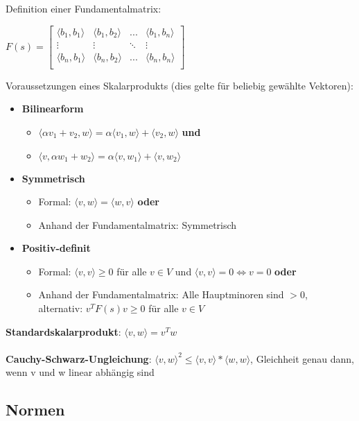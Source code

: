 Definition einer Fundamentalmatrix:
\begin{center}
	$F(s) = \begin{bmatrix}
	\langle b_1, b_1\rangle & \langle b_1, b_2\rangle & ... & \langle b_1, b_n\rangle\\
	\vdots & \vdots & \ddots & \vdots \\
	\langle b_n, b_1\rangle & \langle b_n, b_2\rangle & ... & \langle b_n, b_n\rangle\\			
	\end{bmatrix}$
\end{center}
Voraussetzungen eines Skalarprodukts (dies gelte für beliebig gewählte Vektoren):
\begin{itemize}
	\item \textbf{Bilinearform}
	\begin{itemize}
		\item $\langle \alpha v_1 + v_2, w\rangle = \alpha\langle  v_1, w\rangle + \langle v_2, w\rangle$ \textbf{und}
		\item $\langle v, \alpha w_1 + w_2\rangle = \alpha\langle  v, w_1\rangle + \langle v, w_2\rangle$
	\end{itemize}
	\item \textbf{Symmetrisch}
	\begin{itemize}
		\item Formal: $\langle v, w\rangle = \langle w, v\rangle$ \textbf{oder}
		\item Anhand der Fundamentalmatrix: Symmetrisch
	\end{itemize}
	\item \textbf{Positiv-definit}
	\begin{itemize}
		\item Formal: $\langle v, v\rangle \geq 0$ für alle $v \in V$ und $\langle v, v\rangle = 0 \Leftrightarrow v = 0$ \textbf{oder}
		\item Anhand der Fundamentalmatrix: Alle Hauptminoren sind $> 0$,\\alternativ: $v^TF(s)v \geq 0$ für alle $v \in V$
	\end{itemize}
\end{itemize}
\textbf{Standardskalarprodukt}: $\langle v, w\rangle = v^Tw$\\\\
\textbf{Cauchy-Schwarz-Ungleichung}: $\langle v, w\rangle^2 \leq \langle v, v\rangle * \langle w, w\rangle$, Gleichheit genau dann, wenn v und w linear abhängig sind

\subsection{Normen}%
\label{sp:sub:normen}

